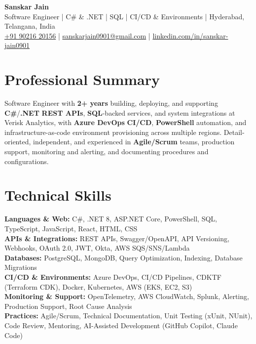 \documentclass[a4paper,10pt]{article}
\begin{document}
\begin{center}
    {\LARGE \textbf{Sanskar Jain}} \\
    \vspace{2pt}
    Software Engineer \;|\; C\# \& .NET \;|\; SQL \;|\; CI/CD \& Environments \;|\; Hyderabad, Telangana, India \\
    \href{tel:+919021620156}{+91 90216 20156} \;|\;
    \href{mailto:sanskarjain0901@gmail.com}{sanskarjain0901@gmail.com} \;|\;
    \href{https://www.linkedin.com/in/sanskar-jain0901/}{linkedin.com/in/sanskar-jain0901}
\end{center}

\section*{Professional Summary}
Software Engineer with \textbf{2+ years} building, deploying, and supporting \textbf{C\#}/\textbf{.NET} \textbf{REST APIs}, \textbf{SQL}-backed services, and system integrations at Verisk Analytics, with \textbf{Azure DevOps} \textbf{CI/CD}, \textbf{PowerShell} automation, and infrastructure-as-code environment provisioning across multiple regions.
Detail-oriented, independent, and experienced in \textbf{Agile/Scrum} teams, production support, monitoring and alerting, and documenting procedures and configurations.

\section*{Technical Skills}
\begin{sloppypar}
\noindent
\textbf{Languages \& Web:} C\#, .NET 8, ASP.NET Core, PowerShell, SQL, TypeScript, JavaScript, React, HTML, CSS \\
\textbf{APIs \& Integrations:} REST APIs, Swagger/OpenAPI, API Versioning, Webhooks, OAuth 2.0, JWT, Okta, AWS SQS/SNS/Lambda \\
\textbf{Databases:} PostgreSQL, MongoDB, Query Optimization, Indexing, Database Migrations \\
\textbf{CI/CD \& Environments:} Azure DevOps, CI/CD Pipelines, CDKTF (Terraform CDK), Docker, Kubernetes, AWS (EKS, EC2, S3) \\
\textbf{Monitoring \& Support:} OpenTelemetry, AWS CloudWatch, Splunk, Alerting, Production Support, Root Cause Analysis \\
\textbf{Practices:} Agile/Scrum, Technical Documentation, Unit Testing (xUnit, NUnit), Code Review, Mentoring, AI-Assisted Development (GitHub Copilot, Claude Code)
\end{sloppypar}
\end{document}
